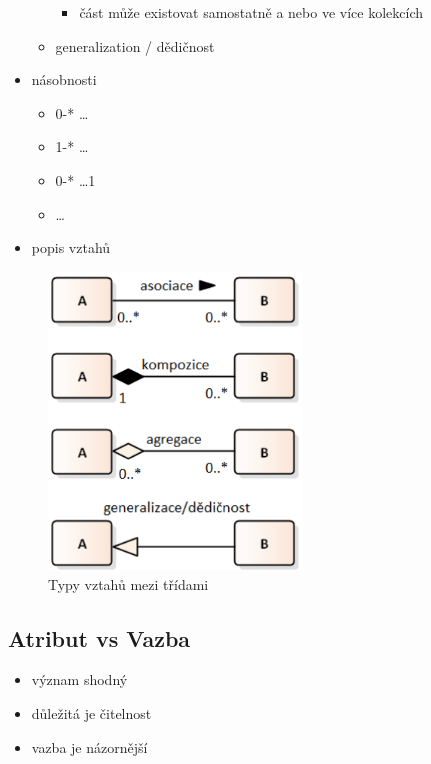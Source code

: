 \documentclass{szzclass}
\begin{document}
\begin{itemize}
\begin{itemize}
\begin{itemize}
            \item část může existovat samostatně a nebo ve více kolekcích
        \end{itemize}
        \item generalization / dědičnost
    \end{itemize}
    \item násobnosti
    \begin{itemize}
        \item 0-* \dots *
        \item 1-* \dots *
        \item 0-* \dots 1
        \item \dots
    \end{itemize}
    \item popis vztahů
\end{itemize}
\begin{figure}[h!]
    \centering
    \includegraphics[width=0.6\textwidth]{topics/bi-spol-31/images/connectionTypes.png}
    \caption{Typy vztahů mezi třídami}
\end{figure}
\subsection{Atribut vs Vazba}
\begin{itemize}
    \item význam shodný
    \item důležitá je čitelnost
    \item vazba je názornější
\end{itemize}
\end{document}
